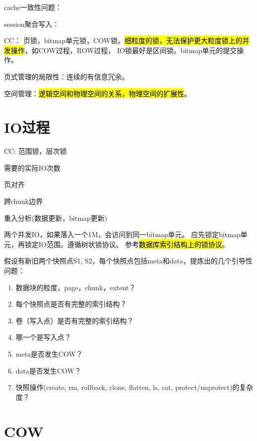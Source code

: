 cache一致性问题：

session聚合写入：

CC： 页锁，bitmap单元锁，COW锁。\hl{细粒度的锁，无法保护更大粒度锁上的并发操作}，如COW过程，ROW过程，
IO锁最好是区间锁。bitmap单元的提交操作。

页式管理的局限性：连续的有信息冗余。

空间管理：\hl{逻辑空间和物理空间的关系，物理空间的扩展性}。

\section{IO过程}

\begin{itembox}
\item CC: 范围锁，层次锁
\item 需要的实际IO次数
\item 页对齐
\item 跨chunk边界
\item 重入分析(数据更新，bitmap更新)
\end{itembox}

两个并发IO，如果落入一个1M，会访问到同一bitmap单元。
应先锁定bitmap单元，再锁定IO范围。遵循树状锁协议。
参考\hl{数据库索引结构上的锁协议}。

\begin{tcolorbox}

假设有新旧两个快照点S1, S2，每个快照点包括meta和data，提炼出的几个引导性问题：

\begin{enumerate}
    \item 数据块的粒度，page，chunk，extent？
    \item 每个快照点是否有完整的索引结构？
    \item 卷（写入点）是否有完整的索引结构？
    \item 哪一个是写入点？
    \item meta是否发生COW？
    \item data是否发生COW？
    \item 快照操作(create, rm, rollback, clone, flatten, ls, cat, protect/unprotect)的复杂度？
\end{enumerate}

\end{tcolorbox}

\section{COW}


